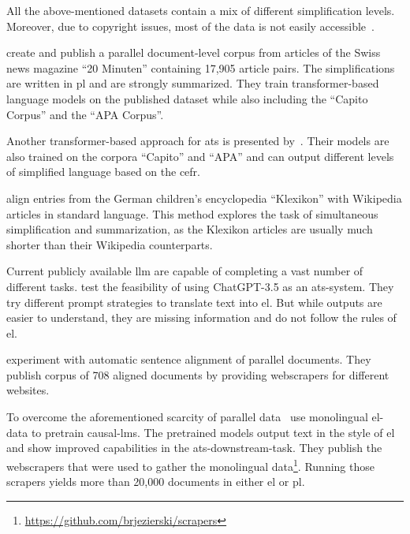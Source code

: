 All the above-mentioned datasets contain a mix of different simplification levels.
Moreover, due to copyright issues, most of the data is not easily accessible~\autocite{stodden-etal-2023-deplain}.

\textcite{rios-etal-2021-new} create and publish a parallel document-level corpus from articles of the Swiss news magazine \enquote{20 Minuten} containing 17,905 article pairs.
The simplifications are written in \gls{pl} and are strongly summarized.
They train transformer-based language models on the published dataset while also including the \enquote{Capito Corpus} and the \enquote{APA Corpus}.

Another transformer-based approach for \gls{ats} is presented by~\textcite{spring-etal-2021-exploring}.
Their models are also trained on the corpora \enquote{Capito} and \enquote{APA} and can output different levels of simplified language based on the \gls{cefr}.

\textcite{aumiller2022klexikon} align entries from the German children’s encyclopedia \enquote{Klexikon} with Wikipedia articles in standard language.
This method explores the task of simultaneous simplification and summarization, as the Klexikon articles are usually much shorter than their Wikipedia counterparts.

Current publicly available \gls{llm} are capable of completing a vast number of different tasks.
\textcite{deilen2023using} test the feasibility of using ChatGPT-3.5 as an \gls{ats}-system.
They try different prompt strategies to translate text into \gls{el}.
But while outputs are easier to understand, they are missing information and do not follow the rules of \gls{el}.

\textcite{toborek2023new} experiment with automatic sentence alignment of parallel documents.
They publish corpus of 708 aligned documents by providing \gls{webscraper}s for different websites.

To overcome the aforementioned scarcity of parallel data~\textcite{Ansch_tz_2023} use monolingual \gls{el}-data to pretrain \gls{causal-lm}s.
The pretrained models output text in the style of \gls{el} and show improved capabilities in the \gls{ats}-downstream-task.
They publish the \gls{webscraper}s that were used to gather the monolingual data\footnote{\url{https://github.com/brjezierski/scrapers}}.
Running those scrapers yields more than 20,000 documents in either \gls{el} or \gls{pl}.

